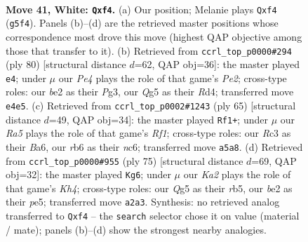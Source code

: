 \documentclass[11pt]{article}
\begin{document}
\clearpage

\begin{figure}[p]\centering
\begin{subfigure}{0.46\textwidth}\centering
\resizebox{\linewidth}{!}{%
\newchessgame
\chessboard[
  setfen={1k2rn2/1p6/1r1p4/R5Q1/4Pp2/1PR5/K3b1PP/8 w - - 2 41},
  showmover=false,
  pgfstyle=straightmove, color=movearrow, markmove={g5-f4}
]}
\caption{}
\end{subfigure}\hfill
\begin{subfigure}{0.46\textwidth}\centering
\resizebox{\linewidth}{!}{%
\newchessgame
\chessboard[
  setfen={8/1r3p2/pP2k3/3pr2p/1P1R1R2/6P1/4P2P/3K4 w - - 1 41},
  showmover=false,
  pgfstyle=straightmove, color=movearrow, markmove={e2-e4}
]}
\caption{}
\end{subfigure}
\\[4pt]
\begin{subfigure}{0.46\textwidth}\centering
\resizebox{\linewidth}{!}{%
\newchessgame
\chessboard[
  setfen={5rk1/8/b1N3pp/p2p3r/7P/1PR1P1P1/8/3RK3 b - - 0 33},
  showmover=false,
  pgfstyle=straightmove, color=movearrow, markmove={f8-f1}
]}
\caption{}
\end{subfigure}\hfill
\begin{subfigure}{0.46\textwidth}\centering
\resizebox{\linewidth}{!}{%
\newchessgame
\chessboard[
  setfen={8/pp5r/2r5/PR2Pp1k/1p1P4/6Pp/7P/5RK1 b - - 4 38},
  showmover=false,
  pgfstyle=straightmove, color=movearrow, markmove={h5-g6}
]}
\caption{}
\end{subfigure}
\caption{\textbf{Move 41, White: \texttt{Qxf4}.} (a) Our position; Melanie plays \texttt{Qxf4} (\texttt{g5f4}). Panels (b)--(d) are the retrieved master positions whose correspondence most drove this move (highest QAP objective among those that transfer to it). (b) Retrieved from \texttt{ccrl\_top\_p0000\#294} (ply 80) [structural distance $d$=62, QAP obj=36]: the master played \texttt{e4}; under $\mu$ our \emph{Pe4} plays the role of that game's \emph{Pe2}; cross-type roles: our \emph{b}e2 as their \emph{P}g3, our \emph{Q}g5 as their \emph{R}d4; transferred move \texttt{e4e5}. (c) Retrieved from \texttt{ccrl\_top\_p0002\#1243} (ply 65) [structural distance $d$=49, QAP obj=34]: the master played \texttt{Rf1+}; under $\mu$ our \emph{Ra5} plays the role of that game's \emph{Rf1}; cross-type roles: our \emph{R}c3 as their \emph{B}a6, our \emph{r}b6 as their \emph{n}c6; transferred move \texttt{a5a8}. (d) Retrieved from \texttt{ccrl\_top\_p0000\#955} (ply 75) [structural distance $d$=69, QAP obj=32]: the master played \texttt{Kg6}; under $\mu$ our \emph{Ka2} plays the role of that game's \emph{Kh4}; cross-type roles: our \emph{Q}g5 as their \emph{r}b5, our \emph{b}e2 as their \emph{p}e5; transferred move \texttt{a2a3}. Synthesis: no retrieved analog transferred to \texttt{Qxf4} -- the \texttt{search} selector chose it on value (material / mate); panels (b)--(d) show the strongest nearby analogies.}
\label{fig:thought-m80}
\end{figure}
\end{document}
